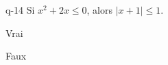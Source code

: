 \begin{truefalse}{q-14}
Si $x^2+2x\leq 0$, alors $|x+1|\leq 1$.
\item* Vrai
\item Faux
\end{truefalse}

